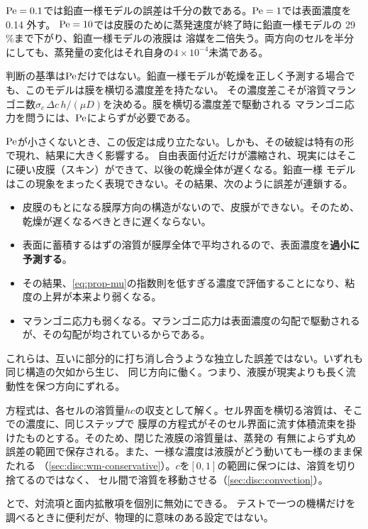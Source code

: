 $\mathrm{Pe} = 0.1$では鉛直一様モデルの誤差は千分の数である。$\mathrm{Pe} = 1$では表面濃度を 0.14 外す。
$\mathrm{Pe} = 10$では皮膜のために蒸発速度が終了時に鉛直一様モデルの 29 \%まで下がり、鉛直一様モデルの液膜は
溶媒を二倍失う。両方向のセルを半分にしても、蒸発量の変化はそれ自身の$4\times10^{-4}$未満である。

判断の基準は$\mathrm{Pe}$だけではない。鉛直一様モデルが乾燥を正しく予測する場合でも、このモデルは膜を横切る濃度差を持たない。
その濃度差こそが溶質マランゴニ数$\sigma_c\,\Delta c\,h/(\mu D)$を決める。膜を横切る濃度差で駆動される
マランゴニ応力を問うには、$\mathrm{Pe}$によらずが必要である。

$\mathrm{Pe}$が小さくないとき、この仮定は成り立たない。しかも、その破綻は特有の形で現れ、結果に大きく影響する。
自由表面付近だけが濃縮され、現実にはそこに硬い皮膜（スキン）ができて、以後の乾燥全体が遅くなる。鉛直一様
モデルはこの現象をまったく表現できない。その結果、次のように誤差が連鎖する。

\begin{itemize}
  \item 皮膜のもとになる膜厚方向の構造がないので、皮膜ができない。そのため、乾燥が遅くなるべきときに遅くならない。
  \item 表面に蓄積するはずの溶質が膜厚全体で平均されるので、表面濃度を\textbf{過小に予測する}。
  \item その結果、\cref{eq:prop-mu}の指数則を低すぎる濃度で評価することになり、粘度の上昇が本来より弱くなる。
  \item マランゴニ応力も弱くなる。マランゴニ応力は表面濃度の勾配で駆動されるが、その勾配が均されているからである。
\end{itemize}

これらは、互いに部分的に打ち消し合うような独立した誤差ではない。いずれも同じ構造の欠如から生じ、
同じ方向に働く。つまり、液膜が現実よりも長く流動性を保つ方向にずれる。

方程式は、各セルの溶質量$hc$の収支として解く。セル界面を横切る溶質は、そこでの濃度に、同じステップで
膜厚の方程式がそのセル界面に流す体積流束を掛けたものとする。そのため、閉じた液膜の溶質量は、蒸発の
有無によらず丸め誤差の範囲で保存される。また、一様な濃度は液膜がどう動いても一様のまま保たれる
（\cref{sec:disc:wm-conservative}）。$c$を$[0, 1]$の範囲に保つには、溶質を切り捨てるのではなく、
セル間で溶質を移動させる（\cref{sec:disc:convection}）。

とで、対流項と面内拡散項を個別に無効にできる。
テストで一つの機構だけを調べるときに便利だが、物理的に意味のある設定ではない。


